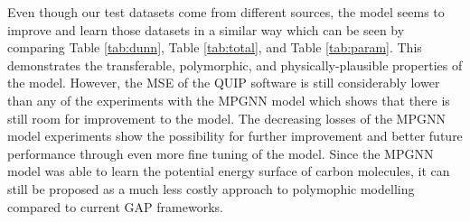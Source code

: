 \documentclass[12pt, abstract = true]{scrartcl}
\begin{document}
Even though our test datasets come from different sources, the model seems to improve and learn those datasets in a similar way which can be seen by comparing Table \ref{tab:dunn}, Table \ref{tab:total}, and Table \ref{tab:param}. This demonstrates the transferable, polymorphic, and physically-plausible properties of the model. However, the MSE of the QUIP software is still considerably lower than any of the experiments with the MPGNN model which shows that there is still room for improvement to the model. The decreasing losses of the MPGNN model experiments show the possibility for further improvement and better future performance through even more fine tuning of the model. Since the MPGNN model was able to learn the potential energy surface of carbon molecules, it can still be proposed as a much less costly approach to polymophic modelling compared to current GAP frameworks. 
\end{document}
